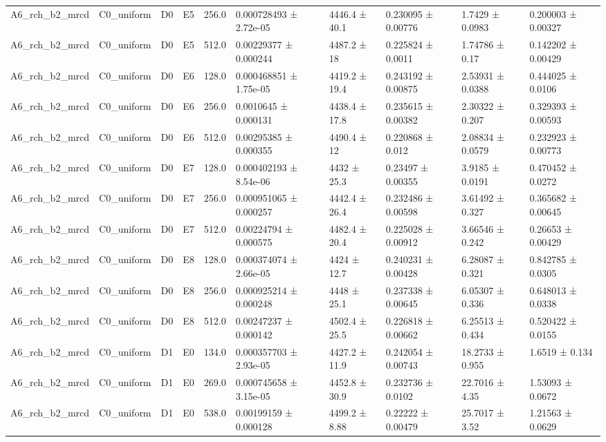 \begin{table}
\begin{tabular}{llllllllll}
A6\_rch\_b2\_mrcd & C0\_uniform & D0 & E5 & 256.0 & 0.000728493 ± 2.72e-05 & 4446.4 ± 40.1 & 0.230095 ± 0.00776 & 1.7429 ± 0.0983 & 0.200003 ± 0.00327 \\
A6\_rch\_b2\_mrcd & C0\_uniform & D0 & E5 & 512.0 & 0.00229377 ± 0.000244 & 4487.2 ± 18 & 0.225824 ± 0.0011 & 1.74786 ± 0.17 & 0.142202 ± 0.00429 \\
A6\_rch\_b2\_mrcd & C0\_uniform & D0 & E6 & 128.0 & 0.000468851 ± 1.75e-05 & 4419.2 ± 19.4 & 0.243192 ± 0.00875 & 2.53931 ± 0.0388 & 0.444025 ± 0.0106 \\
A6\_rch\_b2\_mrcd & C0\_uniform & D0 & E6 & 256.0 & 0.0010645 ± 0.000131 & 4438.4 ± 17.8 & 0.235615 ± 0.00382 & 2.30322 ± 0.207 & 0.329393 ± 0.00593 \\
A6\_rch\_b2\_mrcd & C0\_uniform & D0 & E6 & 512.0 & 0.00295385 ± 0.000355 & 4490.4 ± 12 & 0.220868 ± 0.012 & 2.08834 ± 0.0579 & 0.232923 ± 0.00773 \\
A6\_rch\_b2\_mrcd & C0\_uniform & D0 & E7 & 128.0 & 0.000402193 ± 8.54e-06 & 4432 ± 25.3 & 0.23497 ± 0.00355 & 3.9185 ± 0.0191 & 0.470452 ± 0.0272 \\
A6\_rch\_b2\_mrcd & C0\_uniform & D0 & E7 & 256.0 & 0.000951065 ± 0.000257 & 4442.4 ± 26.4 & 0.232486 ± 0.00598 & 3.61492 ± 0.327 & 0.365682 ± 0.00645 \\
A6\_rch\_b2\_mrcd & C0\_uniform & D0 & E7 & 512.0 & 0.00224794 ± 0.000575 & 4482.4 ± 20.4 & 0.225028 ± 0.00912 & 3.66546 ± 0.242 & 0.26653 ± 0.00429 \\
A6\_rch\_b2\_mrcd & C0\_uniform & D0 & E8 & 128.0 & 0.000374074 ± 2.66e-05 & 4424 ± 12.7 & 0.240231 ± 0.00428 & 6.28087 ± 0.321 & 0.842785 ± 0.0305 \\
A6\_rch\_b2\_mrcd & C0\_uniform & D0 & E8 & 256.0 & 0.000925214 ± 0.000248 & 4448 ± 25.1 & 0.237338 ± 0.00645 & 6.05307 ± 0.336 & 0.648013 ± 0.0338 \\
A6\_rch\_b2\_mrcd & C0\_uniform & D0 & E8 & 512.0 & 0.00247237 ± 0.000142 & 4502.4 ± 25.5 & 0.226818 ± 0.00662 & 6.25513 ± 0.434 & 0.520422 ± 0.0155 \\
A6\_rch\_b2\_mrcd & C0\_uniform & D1 & E0 & 134.0 & 0.000357703 ± 2.93e-05 & 4427.2 ± 11.9 & 0.242054 ± 0.00743 & 18.2733 ± 0.955 & 1.6519 ± 0.134 \\
A6\_rch\_b2\_mrcd & C0\_uniform & D1 & E0 & 269.0 & 0.000745658 ± 3.15e-05 & 4452.8 ± 30.9 & 0.232736 ± 0.0102 & 22.7016 ± 4.35 & 1.53093 ± 0.0672 \\
A6\_rch\_b2\_mrcd & C0\_uniform & D1 & E0 & 538.0 & 0.00199159 ± 0.000128 & 4499.2 ± 8.88 & 0.22222 ± 0.00479 & 25.7017 ± 3.52 & 1.21563 ± 0.0629 \\

\end{tabular}
\end{table}
